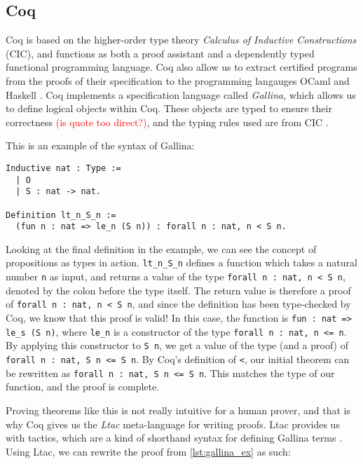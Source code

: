 \subsection{Coq}
\label{ssec:coq}

Coq is based on the higher-order type theory \emph{Calculus of Inductive Constructions} (CIC), and
functions as both a proof assistant and a dependently typed functional programming language.
Coq also allow us to extract certified programs from the proofs of their specification to
the programming langauges OCaml and Haskell \cite{cintro}.
Coq implements a specification language called \emph{Gallina},
which allows us to define logical objects within Coq.
These objects are typed to ensure their correctness \textcolor{red}{(is quote too direct?)},
and the typing rules used are from CIC \cite{cic}.

This is an example of the syntax of Gallina:

\begin{minipage}{\linewidth}
\begin{lstlisting}[language=Coq, label={lst:gallina_ex}, caption={Example of Gallina syntax}]
Inductive nat : Type :=
  | O
  | S : nat -> nat.

Definition lt_n_S_n :=
  (fun n : nat => le_n (S n)) : forall n : nat, n < S n.
\end{lstlisting}
\end{minipage}

Looking at the final definition in the example, we can see the
concept of propositions as types in action.
\lstinline{lt_n_S_n} defines a function which takes a natural number \lstinline{n}
as input, and returns a value of the type \lstinline{forall n : nat, n < S n},
denoted by the colon before the type itself.
The return value is therefore a proof of \lstinline{forall n : nat, n < S n}, and since
the definition has been type-checked by Coq, we know that this proof is valid!
In this case, the function is
\lstinline{fun : nat => le_s (S n)}, where \lstinline{le_n} is a constructor
of the type \lstinline{forall n : nat, n <= n}. By applying this constructor
to \lstinline{S n}, we get a value of the type (and a proof) of
\lstinline{forall n : nat, S n <= S n}. By Coq's definition of \lstinline{<},
our initial theorem can be rewritten as \lstinline{forall n : nat, S n <= S n}.
This matches the type of our function, and the proof is complete.

Proving theorems like this is not really intuitive for a human prover,
and that is why Coq gives us the \emph{Ltac} meta-language for writing proofs.
Ltac provides us with tactics, which are a kind of shorthand syntax for defining Gallina terms \cite{cltac}.
Using Ltac, we can rewrite the proof from \ref{lst:gallina_ex} as such:

